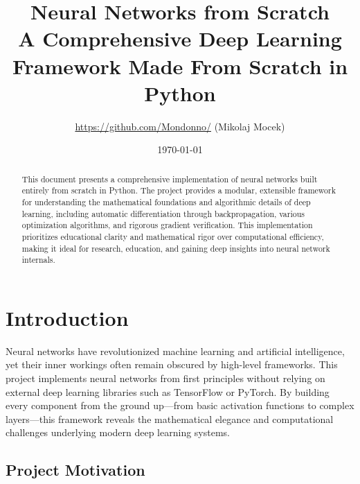 \documentclass[12pt,a4paper]{article}
\title{\textbf{Neural Networks from Scratch}\\
\Large A Comprehensive Deep Learning Framework Made From Scratch in Python}
\author{\url{https://github.com/Mondonno/} (Mikolaj Mocek)}
\date{\today}
\begin{document}
\maketitle

\begin{center}
\end{center}

\vspace{0.5cm}

\begin{abstract}
This document presents a comprehensive implementation of neural networks built entirely from scratch in Python. The project provides a modular, extensible framework for understanding the mathematical foundations and algorithmic details of deep learning, including automatic differentiation through backpropagation, various optimization algorithms, and rigorous gradient verification. This implementation prioritizes educational clarity and mathematical rigor over computational efficiency, making it ideal for research, education, and gaining deep insights into neural network internals.
\end{abstract}

\tableofcontents
\newpage

\section{Introduction}

Neural networks have revolutionized machine learning and artificial intelligence, yet their inner workings often remain obscured by high-level frameworks. This project implements neural networks from first principles without relying on external deep learning libraries such as TensorFlow or PyTorch. By building every component from the ground up—from basic activation functions to complex layers—this framework reveals the mathematical elegance and computational challenges underlying modern deep learning systems.

\subsection{Project Motivation}
\end{document}
